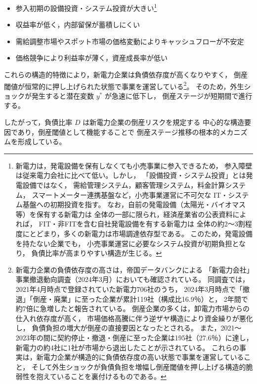 \begin{itemize}
    \item 参入初期の設備投資・システム投資が大きい\footnote{
    新電力は，発電設備を保有しなくても小売事業に参入できるため，
    参入障壁は従来電力会社に比べて低い。しかし，
    「設備投資・システム投資」とは発電設備ではなく，
    需給管理システム，顧客管理システム，料金計算システム，
    スマートメーター連携基盤など，小売事業運営に不可欠な
    IT・システム基盤への初期投資を指す。
    なお，自前の発電設備（太陽光・バイオマス等）を保有する新電力は
    全体の一部に限られ，経済産業省の公表資料によれば，
    FIT・非FITを含む自社発電設備を有する新電力は
    全体の約2～3割程度にとどまり，多くの新電力は市場調達依存型である。
    このため，発電設備を持たない企業でも，
    小売事業運営に必要なシステム投資が初期負担となり，
    負債比率が高まりやすい構造が生じる。}  
    \item 収益率が低く，内部留保が蓄積しにくい  
    \item 需給調整市場やスポット市場の価格変動によりキャッシュフローが不安定  
    \item 価格競争により利益率が薄く，資産成長率が低い  
\end{itemize}

これらの構造的特徴により，新電力企業は負債依存度が高くなりやすく，
倒産閾値が恒常的に押し上げられた状態で事業を運営している\footnote{
新電力企業の負債依存度の高さは，帝国データバンクによる
「新電力会社」事業撤退動向調査（2024年3月）においても確認されている。
同調査では，2021年4月時点で登録されていた新電力706社のうち，
2024年3月時点で「撤退」「倒産・廃業」に至った企業が累計119社（構成比16.9％）と，
2年間で約7倍に急増したと報告されている。
倒産企業の多くは，卸電力市場からの仕入れ依存度が高く，
市場価格高騰に伴う逆ザヤ構造により資金繰りが悪化し，
負債負担の増大が倒産の直接要因となったとされる。
また，2021～2023年の間に契約停止・撤退・倒産に至った企業は195社（27.6％）に達し，
新電力の約4社に1社が市場から退出したことが示されている。
これらの事実は，新電力企業が構造的に負債依存度の高い状態で事業を運営していること，
そして外生ショックが負債負担を増幅し倒産閾値を押し上げる構造的脆弱性を抱えていることを裏付けるものである。}。
そのため，外生ショックが発生すると潜在変数 $y^*$ が急速に低下し，
倒産ステージが短期間で進行する。

したがって，負債比率 $D$ は新電力企業の倒産リスクを規定する
中心的な構造要因であり，倒産閾値として機能することで
倒産ステージ推移の根本的メカニズムを形成している。


